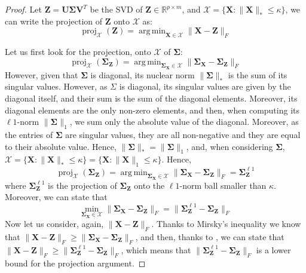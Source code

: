 \documentclass[12pt]{article}
\DeclareMathOperator*{\argmin}{arg\,min}
\DeclareMathOperator*{\proj}{proj}
\newcommand{\boldZ}{\mathbf{Z}}
\newcommand{\boldX}{\mathbf{X}}
\newcommand{\boldU}{\mathbf{U}}
\newcommand{\boldV}{\mathbf{V}}
\newcommand{\setX}{\mathcal{X}}
\newcommand{\boldS}{\mathbf{\Sigma}}
\begin{document}
\begin{proof}
Let $\boldZ = \boldU\boldS\boldV^T$ be the SVD of $\boldZ \in \mathbb{R}^{p \times m}$, and $\setX = \{ \boldX : \lVert \boldX \rVert_{*} \leq \kappa \}$, we can write the projection of $\boldZ$ onto $\setX$ as:
\begin{equation}
    \proj_{\setX}(\boldZ) = \argmin_{\boldX \in \setX} \lVert \boldX - \boldZ \rVert_{F}
\end{equation}

Let us first look for the projection, onto $\setX$ of $\boldS$:
\begin{equation}
    \proj_{\setX}(\boldS_{\boldZ}) = \argmin_{\boldS_{\boldX} \in \setX} \lVert \boldS_{\boldX} - \boldS_{\boldZ} \rVert_{F}
\end{equation}
However, given that $\boldS$ is diagonal, its nuclear norm $\lVert \boldS \rVert_{*}$ is the sum of its singular values. However, as $\Sigma$ is diagonal, its singular values are given by the diagonal itself, and their sum is the sum of the diagonal elements. Moreover, its diagonal elements are the only non-zero elements, and then, when computing its $\ell1$-norm $\lVert \boldS \rVert_{1}$, we sum only the absolute value of the diagonal. Moreover, as the entries of $\boldS$ are singular values, they are all non-negative and they are equal to their absolute value. Hence, $\lVert \boldS \rVert_{*} = \lVert \boldS \rVert_{1}$, and, when considering $\boldS$, $\setX = \{ \boldX : \lVert \boldX \rVert_{*} \leq \kappa \} = \{ \boldX : \lVert \boldX \rVert_{1} \leq \kappa \}$. Hence,
\begin{equation}
     \proj_{\setX}(\boldS_{\boldZ}) = \argmin_{\boldS_{\boldX} \in \setX} \lVert \boldS_{\boldX} - \boldS_{\boldZ} \rVert_{F} = \boldS_{\boldZ}^{\ell1}
\end{equation}
where $\boldS_{\boldZ}^{\ell1}$ is the projection of $\boldS_{\boldZ}$ onto the $\ell1$-norm ball smaller than $\kappa$. Moreover, we can state that
\begin{equation}
    \min_{\boldS_{\boldX} \in \setX} \lVert \boldS_{\boldX} - \boldS_{\boldZ} \rVert_{F} = \lVert \boldS_{\boldZ}^{\ell1} - \boldS_{\boldZ} \rVert_{F} \label{eq:sigma-proj}    
\end{equation}
Now let us consider, again, $\lVert \boldX - \boldZ \rVert_{F}$. Thanks to Mirsky's inequality we know that $\lVert \boldX - \boldZ \rVert_{F} \geq \lVert \boldS_{\boldX} - \boldS_{\boldZ} \rVert_{F}$, and then, thanks to , we can state that $\lVert \boldX - \boldZ \rVert_{F} \geq \lVert \boldS_{\boldZ}^{\ell1} - \boldS_{\boldZ} \rVert_{F}$, which means that $\lVert \boldS_{\boldZ}^{\ell1} - \boldS_{\boldZ} \rVert_{F}$ is a lower bound for the projection argument.


\end{proof}
\end{document}
